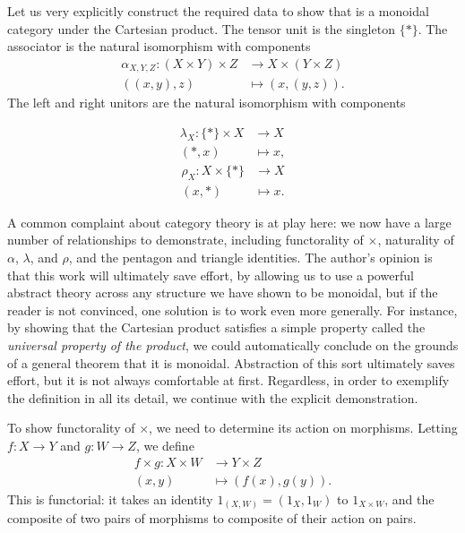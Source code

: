 \begin{ex}
  Let us very explicitly construct the required data to show that
   is a monoidal category under the Cartesian product. The tensor unit
  is the singleton $\{*\}$. The associator is the natural isomorphism with
  components \begin{align*}
    \alpha_{X,Y,Z} \colon (X\times Y)\times Z &\to X\times(Y\times Z)\\
    ((x, y), z) &\mapsto (x, (y, z)).
  \end{align*}
  The left and right unitors are the natural isomorphism with components
  \begin{multicols}{2}
    \noindent
    \begin{align*}
      \lambda_X \colon \{*\}\times X &\to X \\
      (*, x) &\mapsto x,
    \end{align*}
    \begin{align*}
      \rho_X \colon X\times\{*\} &\to X \\
      (x, *) &\mapsto x.
    \end{align*}
  \end{multicols}

  A common complaint about category theory is at play here: we now have a
  large number of relationships to demonstrate, including
  functorality of $\times$, naturality of $\alpha$, $\lambda$, and $\rho$, and
  the pentagon and triangle identities. The author's opinion is that this work
  will ultimately save effort, by allowing us to use a powerful abstract theory
  across any structure we have shown to be monoidal, but if the reader is not
  convinced, one solution is to work even more generally. For instance, by
  showing that the Cartesian product satisfies a simple property called the
  \emph{universal property of the product}, we could automatically conclude on
  the grounds of a general theorem that it is monoidal. Abstraction of this sort
  ultimately saves effort, but it is not always comfortable at first.
  Regardless, in order to exemplify the definition in all its detail, we
  continue with the explicit demonstration.

  To show functorality of $\times$, we need to determine its action on
  morphisms. Letting $f: X\to Y$ and $g: W\to Z$, we define \begin{align*}
    f\times g\colon X\times W &\to Y\times Z \\
                       (x, y) &\mapsto (f(x), g(y)).
  \end{align*}
  This is functorial: it takes an identity $1_{(X, W)} = (1_X, 1_W)$ to
  $1_{X\times W}$, and the composite of two pairs of morphisms to composite of
  their action on pairs.


\end{ex}

